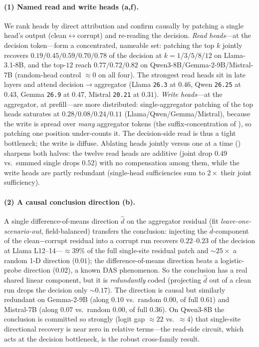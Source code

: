 \paragraph{(1) Named read and write heads (a,f).} We rank heads by direct attribution
and confirm causally by patching a single head's output (clean$\leftrightarrow$corrupt) and re-reading the
decision. \emph{Read heads}---at the decision token---form a concentrated, nameable set: patching the top
$k$ jointly recovers $0.19/0.45/0.59/0.70/0.78$ of the decision at $k{=}1/3/5/8/12$ on Llama-3.1-8B, and
the top-$12$ reach $0.77/0.72/0.82$ on Qwen3-8B/Gemma-2-9B/Mistral-7B (random-head control $\approx 0$ on all
four). The strongest read heads sit in late layers and attend decision$\to$aggregator (Llama \texttt{26.3} at
$0.46$, Qwen \texttt{26.25} at $0.43$, Gemma \texttt{26.9} at $0.47$, Mistral \texttt{20.21} at $0.31$).
\emph{Write heads}---at the aggregator, at prefill---are more distributed: single-aggregator patching of the
top heads saturates at $0.28/0.08/0.24/0.11$ (Llama/Qwen/Gemma/Mistral), because the write is spread over
\emph{many} aggregator tokens (the suffix-concentration of ), so patching one position
under-counts it. The decision-side read is thus a tight bottleneck; the write is diffuse.
Ablating heads jointly versus one at a time () sharpens both halves: the twelve read heads
are additive (joint drop $0.49$ vs.\ summed single drops $0.52$) with no compensation among them, while the
write heads are partly redundant (single-head sufficiencies sum to $2\times$ their joint sufficiency).

\paragraph{(2) A causal conclusion direction (b).} A single difference-of-means direction
$\hat d$ on the aggregator residual (fit \emph{leave-one-scenario-out}, field-balanced) transfers the
conclusion: injecting the $\hat d$-component of the clean$-$corrupt residual into a corrupt run recovers
$0.22$--$0.23$ of the decision at Llama L12--14---$\approx 39\%$ of the full single-site residual patch and
${\sim}25{\times}$ a random 1-D direction ($0.01$); the difference-of-means direction beats a logistic-probe
direction ($0.02$), a known DAS phenomenon. So the conclusion has a real shared linear component, but it is
\emph{redundantly} coded (projecting $\hat d$ out of a clean run drops the decision only ${\sim}0.17$). The
direction is causal but similarly redundant on Gemma-2-9B (along $0.10$ vs.\ random $0.00$, of full $0.61$)
and Mistral-7B (along $0.07$ vs.\ random $0.00$, of full $0.36$). On Qwen3-8B the conclusion is committed so
strongly (logit gap ${\approx}22$ vs.\ ${\approx}4$) that single-site directional recovery is near zero in
relative terms---the read-side circuit, which acts at the decision bottleneck, is the robust cross-family
result.

